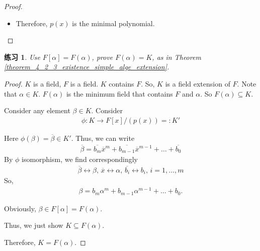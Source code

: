 \documentclass[utf8]{ctexbook}
\newtheorem{exercise}{练习}[section]
\begin{document}
\begin{proof}
\begin{itemize}
{\begin{itemize}
{Consider the set
\begin{align*}
U = \{ f(x) \in F[x] | f(\alpha) = 0 \} .
\end{align*}

$U$ is an ideal of $F[x]$:
\begin{align*}
& f(\alpha) =0, \, g(\alpha) = 0 \implies f(\alpha ) - g(\alpha) = 0 \implies f(x) - g(x) \in U \\
& f(\alpha) r(\alpha) = 0 , \forall r(x) \in F[x] \implies f(x) r(x) \in U
\end{align*}

Since $F[x]$ is PID, $U$ is an ideal in $F[x]$ implies $U$ is a principle ideal, so $U = (p_1 (x)) $.

Note that $p(\alpha) = 0$, so $p(x) \in U$. Thus, $p(x) = a p_1 (x)$ since $p(x)$ is irreducible.

By assumption, $p(x) \in F[x]$ and $p_1(x) \in F[x]$ are monic polynomial, they have leading coefficient $= 1$. This implies that $a=1$. So $p(x) = a p_1 (x) = p_1 (x)$. 
}
\item{Therefore, $p(x)$ is the minimal polynomial.}
\end{itemize}
}
\end{itemize}

\end{proof}

\begin{exercise}
Use $F[\alpha] = F(\alpha)$, prove $F(\alpha) = K$, as in Theorem \ref{theorem_4_2_3_existence_simple_alge_extension}.
\end{exercise}

\begin{proof}
$K$ is a field, $F$ is a field. $K$ contains $F$. So, $K$ is a field extension of $F$. Note that $\alpha \in K$. $F(\alpha)$ is the minimum field that contains $F$ and $\alpha$. So $F(\alpha) \subseteq K$. 

Consider any element $\beta \in K$. Consider
\begin{align*}
\phi : K \longrightarrow F[x]/ (p(x)) =: K'
\end{align*}

Here $\phi(\beta) = \overline{\beta} \in K' $. Thus, we can write
\begin{align*}
\overline{\beta} = \overline{b_m} \overline{x}^m + \overline{b_{m-1}} \overline{x}^{m-1} + \ldots + \overline{b_0}
\end{align*}
By $\phi$ isomorphism, we find correspondingly
\begin{align*}
\overline{\beta } \leftrightarrow \beta, \, \overline{x} \leftrightarrow \alpha, \, \overline{b_i} \leftrightarrow b_i, \, i = 1, \ldots , m
\end{align*}
So,
\begin{align*}
\beta = b_m \alpha^m + b_{m-1} \alpha^{m-1} + \ldots + b_0 .
\end{align*} 

Obviously, $\beta \in F[\alpha] = F(\alpha)$.

Thus, we just show $K \subseteq F(\alpha)$.

Therefore, $K = F(\alpha)$.

\end{proof}
\end{document}
